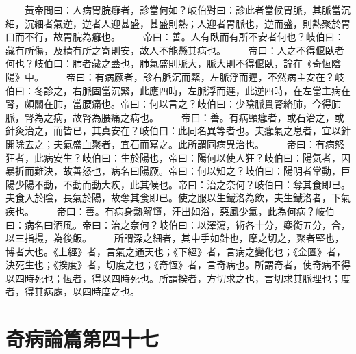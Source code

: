 　　黃帝問曰：人病胃脘癰者，診當何如？岐伯對曰：診此者當候胃脈，其脈當沉細，沉細者氣逆，逆者人迎甚盛，甚盛則熱；人迎者胃脈也，逆而盛，則熱聚於胃口而不行，故胃脘為癰也。
　　帝曰：善。人有臥而有所不安者何也？岐伯曰：藏有所傷，及精有所之寄則安，故人不能懸其病也。
　　帝曰：人之不得偃臥者何也？岐伯曰：肺者藏之蓋也，肺氣盛則脈大，脈大則不得偃臥，論在《奇恆陰陽》中。
　　帝曰：有病厥者，診右脈沉而緊，左脈浮而遲，不然病主安在？岐伯曰：冬診之，右脈固當沉緊，此應四時，左脈浮而遲，此逆四時，在左當主病在腎，頗關在肺，當腰痛也。帝曰：何以言之？岐伯曰：少陰脈貫腎絡肺，今得肺脈，腎為之病，故腎為腰痛之病也。
　　帝曰：善。有病頸癰者，或石治之，或針灸治之，而皆已，其真安在？岐伯曰：此同名異等者也。夫癰氣之息者，宜以針開除去之；夫氣盛血聚者，宜石而寫之。此所謂同病異治也。
　　帝曰：有病怒狂者，此病安生？岐伯曰：生於陽也，帝曰：陽何以使人狂？岐伯曰：陽氣者，因暴折而難決，故善怒也，病名曰陽厥。帝曰：何以知之？岐伯曰：陽明者常動，巨陽少陽不動，不動而動大疾，此其候也。帝曰：治之奈何？岐伯曰：奪其食即已。夫食入於陰，長氣於陽，故奪其食即已。使之服以生鐵洛為飲，夫生鐵洛者，下氣疾也。
　　帝曰：善。有病身熱解墯，汗出如浴，惡風少氣，此為何病？岐伯曰：病名曰酒風。帝曰：治之奈何？岐伯曰：以澤瀉，術各十分，麋銜五分，合，以三指撮，為後飯。
　　所謂深之細者，其中手如針也，摩之切之，聚者堅也，博者大也。《上經》者，言氣之通天也；《下經》者，言病之變化也；《金匱》者，決死生也；《揆度》者，切度之也；《奇恆》者，言奇病也。所謂奇者，使奇病不得以四時死也；恆者，得以四時死也。所謂揆者，方切求之也，言切求其脈理也；度者，得其病處，以四時度之也。


\section{奇病論篇第四十七}

